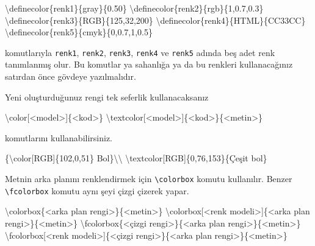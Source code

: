 \documentclass[
  10pt,
]{scrbook}
\newenvironment{Shaded}{}{}
\newcommand{\FunctionTok}[1]{\textcolor[rgb]{0.02,0.16,0.49}{#1}}
\newcommand{\NormalTok}[1]{#1}
\theoremstyle{definition}
\theoremstyle{definition}
\theoremstyle{definition}
\theoremstyle{definition}
\theoremstyle{remark}
\begin{document}
\begin{Shaded}
\begin{Highlighting}[]
\FunctionTok{\textbackslash{}definecolor}\NormalTok{\{renk1\}\{gray\}\{0.50\}}
\FunctionTok{\textbackslash{}definecolor}\NormalTok{\{renk2\}\{rgb\}\{1,0.7,0.3\}}
\FunctionTok{\textbackslash{}definecolor}\NormalTok{\{renk3\}\{RGB\}\{125,32,200\}}
\FunctionTok{\textbackslash{}definecolor}\NormalTok{\{renk4\}\{HTML\}\{CC33CC\}}
\FunctionTok{\textbackslash{}definecolor}\NormalTok{\{renk5\}\{cmyk\}\{0,0.7,1,0.5\}}
\end{Highlighting}
\end{Shaded}

komutlarıyla \texttt{renk1}, \texttt{renk2}, \texttt{renk3}, \texttt{renk4} ve \texttt{renk5} adında beş adet renk tanımlanmış olur. Bu komutlar ya sahanlığa ya da bu renkleri kullanacağınız satırdan önce gövdeye yazılmalıdır.

Yeni oluşturduğunuz rengi tek seferlik kullanacaksanız

\begin{Shaded}
\begin{Highlighting}[]
\FunctionTok{\textbackslash{}color}\NormalTok{[\textless{}model\textgreater{}]\{\textless{}kod\textgreater{}\}}
\FunctionTok{\textbackslash{}textcolor}\NormalTok{[\textless{}model\textgreater{}]\{\textless{}kod\textgreater{}\}\{\textless{}metin\textgreater{}\}}
\end{Highlighting}
\end{Shaded}

komutlarını kullanabilirsiniz.

\begin{Shaded}
\begin{Highlighting}[]
\NormalTok{\{}\FunctionTok{\textbackslash{}color}\NormalTok{[RGB]\{102,0,51\} Bol\}}\FunctionTok{\textbackslash{}\textbackslash{}}
\FunctionTok{\textbackslash{}textcolor}\NormalTok{[RGB]\{0,76,153\}\{Çeşit bol\}}
\end{Highlighting}
\end{Shaded}

Metnin arka planını renklendirmek için \texttt{\textbackslash{}colorbox} komutu kullanılır. Benzer \texttt{\textbackslash{}fcolorbox} komutu aynı şeyi çizgi çizerek yapar.

\begin{Shaded}
\begin{Highlighting}[]
\FunctionTok{\textbackslash{}colorbox}\NormalTok{\{\textless{}arka plan rengi\textgreater{}\}\{\textless{}metin\textgreater{}\}}
\FunctionTok{\textbackslash{}colorbox}\NormalTok{[\textless{}renk modeli\textgreater{}]\{\textless{}arka plan rengi\textgreater{}\}\{\textless{}metin\textgreater{}\}}
\FunctionTok{\textbackslash{}fcolorbox}\NormalTok{\{\textless{}çizgi rengi\textgreater{}\}\{\textless{}arka plan rengi\textgreater{}\}\{\textless{}metin\textgreater{}\}}
\FunctionTok{\textbackslash{}fcolorbox}\NormalTok{[\textless{}renk modeli\textgreater{}]\{\textless{}çizgi rengi\textgreater{}\}\{\textless{}arka plan rengi\textgreater{}\}\{\textless{}metin\textgreater{}\}}
\end{Highlighting}
\end{Shaded}
\end{document}
